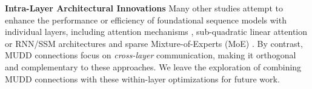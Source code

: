 \textbf{Intra-Layer Architectural Innovations}
Many other studies attempt to enhance the performance or efficiency of foundational sequence models with individual layers, including attention mechanisms \cite{ye2024differential,leviathan2024selective,liu2024deepseek}, sub-quadratic linear attention or RNN/SSM architectures \cite{gu2023mamba,dao2024transformers,peng2024eagle,yang2024parallelizing} and sparse Mixture-of-Experts (MoE) \cite{fedus2022switch,dai2024deepseekmoe}.
By contrast, MUDD connections focus on \emph{cross-layer} communication, making it orthogonal and complementary to these approaches.
We leave the exploration of combining MUDD connections with these within-layer optimizations for future work.